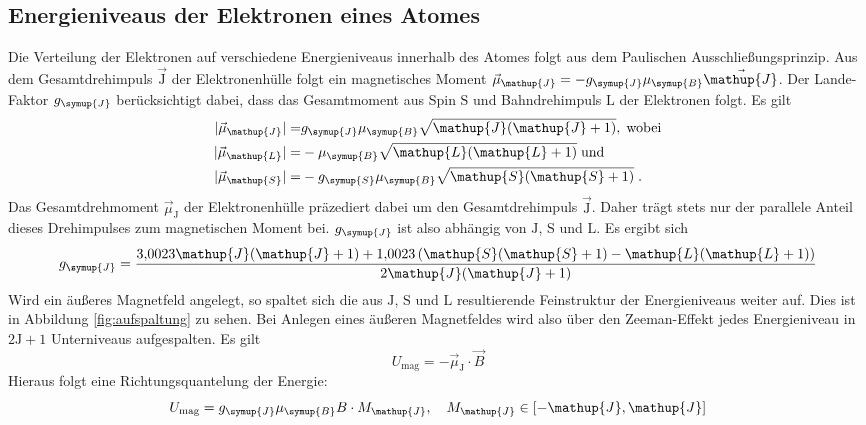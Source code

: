 \documentclass[
  bibliography=totoc,     %
  captions=tableheading,  %
  titlepage=firstiscover, %
]{scrartcl}
\begin{document}
\subsection{Energieniveaus der Elektronen eines Atomes}
%
Die Verteilung der Elektronen auf verschiedene Energieniveaus innerhalb des
Atomes folgt aus dem Paulischen Ausschließungsprinzip. Aus dem
Gesamtdrehimpuls $\vec{\mathup{J}}$ der Elektronenhülle folgt ein magnetisches Moment
$\vec{\mu}_{\mathup{J}}=-g_{\symup{J}}\mu_{\symup{B}}\vec{\mathup{J}}$. Der Lande-Faktor $g_{\symup{J}}$
berücksichtigt dabei, dass das Gesamtmoment aus Spin $\mathup{S}$ und Bahndrehimpuls $\mathup{L}$
der Elektronen folgt. Es gilt
%
\begin{align*}
  |\vec{\mu}_{\mathup{J}}|=&g_{\symup{J}}\mu_{\symup{B}}\sqrt{\mathup{J}(\mathup{J}+1)},\;\text{wobei} \\
  |\vec{\mu}_{\mathup{L}}|=&-\mu_{\symup{B}}\sqrt{\mathup{L}(\mathup{L}+1)}\;\text{und} \\
  |\vec{\mu}_{\mathup{S}}|=&-g_{\symup{S}}\mu_{\symup{B}}\sqrt{\mathup{S}(\mathup{S}+1)}\;.
\end{align*}
%
Das Gesamtdrehmoment $\vec{\mu}_{\mathup{J}}$ der Elektronenhülle präzediert dabei um den
Gesamtdrehimpuls $\vec{\mathup{J}}$. Daher trägt stets nur der parallele Anteil dieses
Drehimpulses zum magnetischen Moment bei. $g_{\symup{J}}$ ist also abhängig von
$\mathup{J}$, $\mathup{S}$ und $\mathup{L}$. Es ergibt sich
%
\begin{equation}
  g_{\symup{J}}=\frac{\num{3.0023}\mathup{J}(\mathup{J}+1)+\num{1.0023}\left(\mathup{S}(\mathup{S}+1)-\mathup{L}(\mathup{L}+1)\right)}{2\mathup{J}(\mathup{J}+1)}
  \label{eq:gj}
\end{equation}
%
Wird ein äußeres Magnetfeld angelegt, so spaltet sich die aus $\mathup{J}$, $\mathup{S}$ und $\mathup{L}$
resultierende Feinstruktur der Energieniveaus weiter auf. Dies ist in Abbildung
\ref{fig:aufspaltung} zu sehen. Bei Anlegen eines äußeren Magnetfeldes wird also über den Zeeman-Effekt jedes
Energieniveau in $2\mathup{J}+1$ Unterniveaus aufgespalten. Es gilt
%
\begin{equation}
  U_{\text{mag}}=-\vec{\mu}_{\mathup{J}}\cdot\vec{B}
\end{equation}
%
Hieraus folgt eine Richtungsquantelung der Energie:
%
\begin{equation}
  U_{\text{mag}}=g_{\symup{J}}\mu_{\symup{B}}B\cdot M_{\mathup{J}},\quad M_{\mathup{J}}\in[-\mathup{J},\mathup{J}]
  \label{penis}
\end{equation}
%
\end{document}
